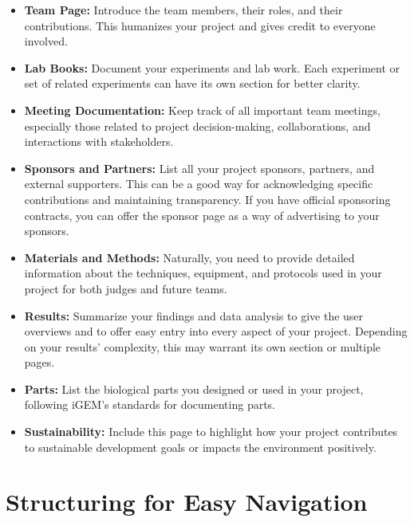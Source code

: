 \begin{itemize}
\item \textbf{Team Page:} Introduce the team members, their roles, and their contributions.
This humanizes your project and gives credit to everyone involved.

\item \textbf{Lab Books:} Document your experiments and lab work.
Each experiment or set of related experiments can have its own section for better clarity.

\item \textbf{Meeting Documentation:} Keep track of all important team meetings, especially those related to project decision-making, collaborations, and interactions with stakeholders.

\item \textbf{Sponsors and Partners:} List all your project sponsors, partners, and external supporters.
This can be a good way for acknowledging specific contributions and maintaining transparency.
If you have official sponsoring contracts, you can offer the sponsor page as a way of advertising to your sponsors.

\item \textbf{Materials and Methods:} Naturally, you need to provide detailed information about the techniques, equipment, and protocols used in your project for both judges and future teams.

\item \textbf{Results:} Summarize your findings and data analysis to give the user overviews and to offer easy entry into every aspect of your project.
Depending on your results' complexity, this may warrant its own section or multiple pages.

\item \textbf{Parts:} List the biological parts you designed or used in your project, following iGEM’s standards for documenting parts.

\item \textbf{Sustainability:} Include this page to highlight how your project contributes to sustainable development goals or impacts the environment positively.
\end{itemize}

\section{Structuring for Easy Navigation}

